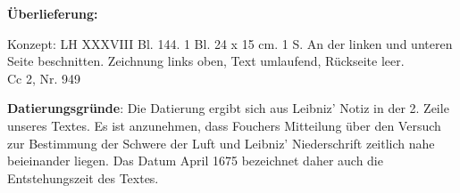       
               
                \begin{ledgroupsized}[r]{120mm}
                \footnotesize 
                \pstart                
                \noindent\textbf{\"{U}berlieferung:}   
                \pend
                \end{ledgroupsized}
            
              
                            \begin{ledgroupsized}[r]{114mm}
                            \footnotesize 
                            \pstart \parindent -6mm
                            Konzept: LH XXXVIII Bl. 144. 1 Bl. 24 x 15 cm. 1 S. An der linken und unteren Seite beschnitten. Zeichnung links oben, Text umlaufend, R\"{u}ckseite leer.\\Cc 2, Nr. 949 \pend
                            \end{ledgroupsized}
                \vspace*{5mm}
                \begin{ledgroup}
                \footnotesize 
                \pstart
            \noindent\footnotesize{\textbf{Datierungsgr\"{u}nde}: Die Datierung ergibt sich aus Leibniz' Notiz in der 2. Zeile unseres Textes. Es ist anzunehmen, dass Fouchers Mitteilung \"{u}ber den Versuch zur Bestimmung der Schwere der Luft und Leibniz' Niederschrift zeitlich nahe beieinander liegen. Das Datum April 1675 bezeichnet daher auch die Entstehungszeit des Textes.}
                \pend
                \end{ledgroup}
            
